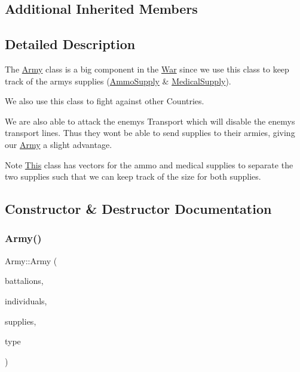 \subsection*{Additional Inherited Members}


\subsection{Detailed Description}
The \mbox{\hyperlink{class_army}{Army}} class is a big component in the \mbox{\hyperlink{class_war}{War}} since we use this class to keep track of the army\textquotesingle{}s supplies (\mbox{\hyperlink{class_ammo_supply}{Ammo\+Supply}} \& \mbox{\hyperlink{class_medical_supply}{Medical\+Supply}}).
\begin{DoxyItemize}
\item We also use this class to fight against other Countries.
\item We are also able to attack the enemy\textquotesingle{}s Transport which will disable the enemy\textquotesingle{}s transport lines. Thus they won\textquotesingle{}t be able to send supplies to their armies, giving our \mbox{\hyperlink{class_army}{Army}} a slight advantage. \begin{DoxyNote}{Note}
\mbox{\hyperlink{class_this}{This}} class has vectors for the ammo and medical supplies to separate the two supplies such that we can keep track of the size for both supplies. 
\end{DoxyNote}

\end{DoxyItemize}

\subsection{Constructor \& Destructor Documentation}
\mbox{\label{class_army_a24aef716a43cb562ed74dcad7ee0163b}} 
\subsubsection{\texorpdfstring{Army()}{Army()}}
{\footnotesize\ttfamily Army\+::\+Army (\begin{DoxyParamCaption}\item[{std\+::vector$<$ \mbox{\hyperlink{class_army_component}{Army\+Component}} $\ast$ $>$ $\ast$}]{battalions,  }\item[{std\+::vector$<$ \mbox{\hyperlink{class_army_component}{Army\+Component}} $\ast$ $>$ $\ast$}]{individuals,  }\item[{std\+::vector$<$ \mbox{\hyperlink{class_supply}{Supply}} $\ast$ $>$ $\ast$}]{supplies,  }\item[{std\+::string}]{type }\end{DoxyParamCaption})}




